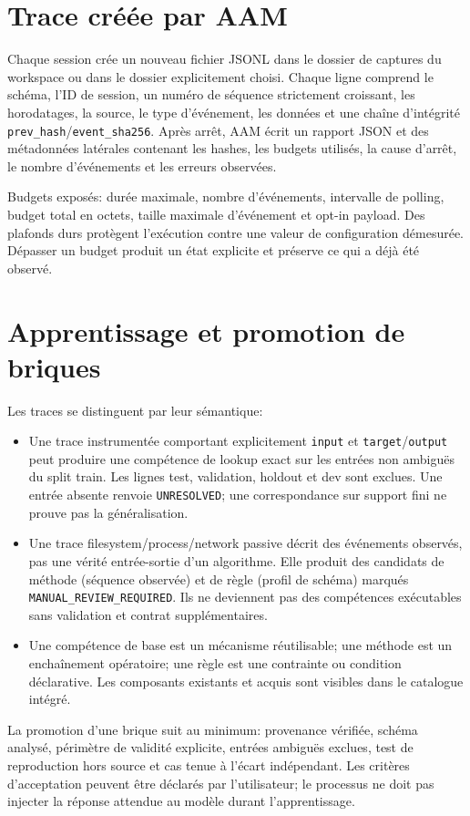 \documentclass[11pt,a4paper]{article}
\begin{document}
\section{Trace créée par AAM}
Chaque session crée un nouveau fichier JSONL dans le dossier de captures du workspace ou dans le dossier explicitement choisi. Chaque ligne comprend le schéma, l'ID de session, un numéro de séquence strictement croissant, les horodatages, la source, le type d'événement, les données et une chaîne d'intégrité \texttt{prev\_hash}/\texttt{event\_sha256}. Après arrêt, AAM écrit un rapport JSON et des métadonnées latérales contenant les hashes, les budgets utilisés, la cause d'arrêt, le nombre d'événements et les erreurs observées.

Budgets exposés: durée maximale, nombre d'événements, intervalle de polling, budget total en octets, taille maximale d'événement et opt-in payload. Des plafonds durs protègent l'exécution contre une valeur de configuration démesurée. Dépasser un budget produit un état explicite et préserve ce qui a déjà été observé.

\section{Apprentissage et promotion de briques}
Les traces se distinguent par leur sémantique:
\begin{itemize}
\item Une trace instrumentée comportant explicitement \texttt{input} et \texttt{target}/\texttt{output} peut produire une compétence de lookup exact sur les entrées non ambiguës du split train. Les lignes test, validation, holdout et dev sont exclues. Une entrée absente renvoie \texttt{UNRESOLVED}; une correspondance sur support fini ne prouve pas la généralisation.
\item Une trace filesystem/process/network passive décrit des événements observés, pas une vérité entrée-sortie d'un algorithme. Elle produit des candidats de méthode (séquence observée) et de règle (profil de schéma) marqués \texttt{MANUAL\_REVIEW\_REQUIRED}. Ils ne deviennent pas des compétences exécutables sans validation et contrat supplémentaires.
\item Une compétence de base est un mécanisme réutilisable; une méthode est un enchaînement opératoire; une règle est une contrainte ou condition déclarative. Les composants existants et acquis sont visibles dans le catalogue intégré.
\end{itemize}
La promotion d'une brique suit au minimum: provenance vérifiée, schéma analysé, périmètre de validité explicite, entrées ambiguës exclues, test de reproduction hors source et cas tenue à l'écart indépendant. Les critères d'acceptation peuvent être déclarés par l'utilisateur; le processus ne doit pas injecter la réponse attendue au modèle durant l'apprentissage.
\end{document}
